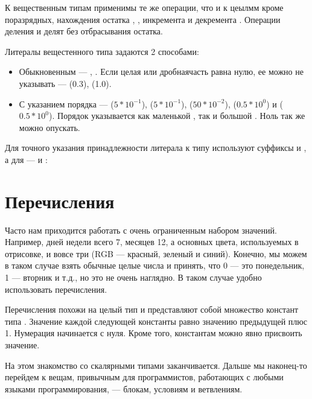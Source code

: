\documentclass[book.tex]{subfiles}
\begin{document}
К вещественным типам применимы те же операции, что и к цеылмм кроме поразрядных, нахождения остатка \cppword{\%}, \cppword{\%=}, инкремента \cppword{++} и декремента \cppword{--}. Операции деления \cppword{/} и \cppword{/=} делят без отбрасывания остатка.

Литералы вещестенного типа задаются 2 способами:

\begin{itemize}
\item Обыкновенным --- , . Если целая или дробнаячасть равна нулю, ее можно не указывать ---  (0.3),  (1.0).
\item С указанием порядка ---  ($5*10^{-1}$),  ($5*10^{-1}$),  ($50*10^{-2}$),  ($0.5*10^{0}$) и  ($0.5*10^{0}$). Порядок указывается как маленькой , так и большой . Ноль так же можно опускать.
\end{itemize}

Для точного указания принадлежности литерала к типу  используют суффиксы  и , а для  ---  и :


\section*{Перечисления}

Часто нам приходится работать с очень ограниченным набором значений. Например, дней недели всего 7, месяцев 12, а основных цвета, используемых в отрисовке, и вовсе три (RGB --- красный, зеленый и синий). Конечно, мы можем в таком случае взять обычные целые числа и принять, что 0 --- это понедельник, 1 --- вторник и т.д., но это не очень наглядно. В таком случае удобно использовать перечисления.

Перечисления похожи на целый тип и представляют собой множество констант типа . Значение каждой следующей константы равно значению предыдущей плюс 1. Нумерация начинается с нуля. Кроме того, константам можно явно присвоить значение.


На этом знакомство со скалярными типами заканчивается. Дальше мы наконец-то перейдем к вещам, привычным для программистов, работающих с любыми языками программирования, --- блокам, условиям и ветвлениям.
\end{document}
